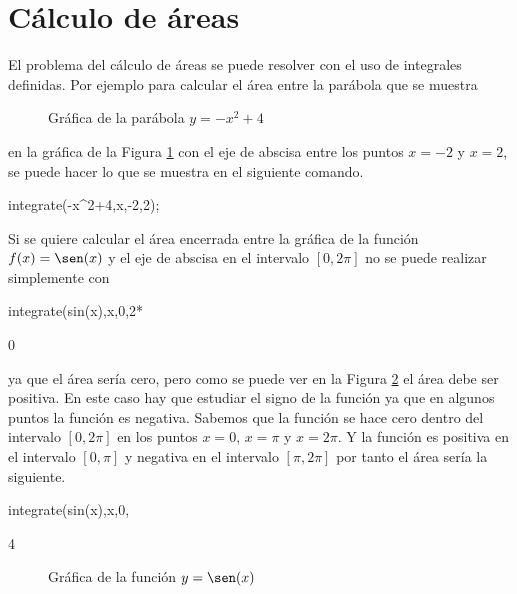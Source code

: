 
\section{Cálculo de áreas}
El problema del cálculo de áreas se puede resolver con el uso
de integrales definidas.
Por ejemplo para calcular el área entre la parábola que se muestra
\begin{figure}
 \centering
 \caption{Gráfica de la parábola $y=-x^2+4$}
 \label{fig:gr1}
\end{figure}
en la gráfica de la Figura \ref{fig:gr1} con el eje de abscisa
entre los puntos $x=-2$ y $x=2$,
se puede hacer lo que se muestra en el siguiente comando.
\begin{maximai}
 integrate(-x^2+4,x,-2,2);
\end{maximai}\begin{maximao}
\end{maximao}

Si se quiere calcular el área encerrada entre la gráfica de la
función $f(x) = \sen(x)$ y el eje de abscisa en el intervalo
$[0,2\pi]$ no se puede realizar simplemente con
\begin{maximai}
 integrate(sin(x),x,0,2*%
\end{maximai}\begin{maximao}
 0
\end{maximao}
ya que el área sería cero,
pero como se puede ver en la Figura \ref{fig:gr2}
el área debe ser positiva.
En este caso hay que estudiar el signo de la función ya que
en algunos puntos la función es negativa.
Sabemos que la función se hace cero dentro del intervalo
$[0,2\pi]$ en los puntos
$x=0$, $x=\pi$ y $x=2\pi$.
Y la función es positiva en el intervalo $[0,\pi]$
y negativa en el intervalo $[\pi,2\pi]$
por tanto el área sería la siguiente.
\begin{maximai}
 integrate(sin(x),x,0,%
\end{maximai}\begin{maximao}
 4
\end{maximao}
\begin{figure}[hb]
 \centering
 \caption{Gráfica de la función $y=\sen(x)$}
 \label{fig:gr2}
\end{figure}

